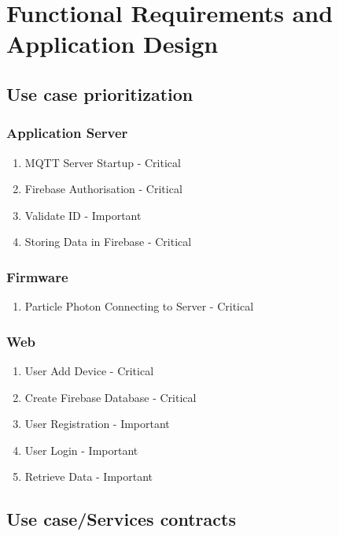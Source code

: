\documentclass{article}
\begin{document}
\section{Functional Requirements and Application Design}
\subsection{Use case prioritization}
\subsubsection{Application Server}
\begin{enumerate}
	\item	MQTT Server Startup - Critical
	\item	Firebase Authorisation - Critical
	\item	Validate ID - Important
	\item	Storing Data in Firebase - Critical
\end{enumerate}
\subsubsection{Firmware}
\begin{enumerate}
	\item	Particle Photon Connecting to Server - Critical
\end{enumerate}
\subsubsection{Web}
\begin{enumerate}
	\item	User Add Device - Critical
	\item	Create Firebase Database - Critical
	\item	User Registration - Important
	\item	User Login - Important
	\item	Retrieve Data  - Important
\end{enumerate}
\subsection{Use case/Services contracts}
\end{document}
